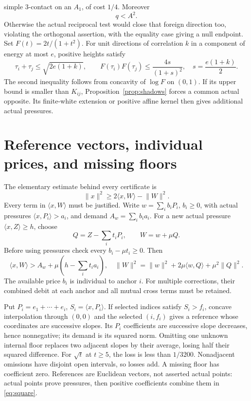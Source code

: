 \documentclass[11pt]{article}
\theoremstyle{definition}
\theoremstyle{remark}
\newcommand{\ip}[2]{\langle #1,#2\rangle}
\newcommand{\norm}[1]{\lVert #1\rVert}
\begin{document}
simple \(3\)-contact on an \(A_1\), of cost \(1/4\).
Moreover
\begin{equation}\label{eq:foreigncost}
 q<A^2.
\end{equation}
Otherwise the actual reciprocal test would close that foreign
direction too, violating the orthogonal assertion, with the
equality case giving a null endpoint.
Set \(F(t)=2t/(1+t^2)\). For unit directions of correlation \(k\)
in a component of energy at most \(e\), positive heights satisfy
\begin{equation}\label{eq:pairupper}
 \tau_i+\tau_j\leq\sqrt{2e(1+k)},\qquad
 F(\tau_i)F(\tau_j)\leq\frac{4s}{(1+s)^2},\quad
 s=\frac{e(1+k)}2.
\end{equation}
The second inequality follows from concavity of \(\log F\) on
\((0,1)\). If its upper bound is smaller than \(K_{ij}\),
Proposition~\ref{prop:shadows} forces a common actual opposite.
Its finite-white extension or positive affine kernel then gives
additional actual pressures.

\section{Reference vectors, individual prices, and missing floors}
\label{sec:references}
The elementary estimate behind every certificate is
\begin{equation}
\label{eq:square}
 \norm{x}^2\geq2\ip{x}{W}-\norm{W}^2.
\end{equation}
Every term in \(\ip{x}{W}\) must be justified.
Write \(w=\sum_i b_iP_i\), \(b_i\geq0\), with actual pressures
\(\ip{x}{P_i}>a_i\), and demand \(A_w=\sum_i b_i a_i\).
For a new actual pressure \(\ip{x}{Z}\geq h\), choose
\[
 Q=Z-\sum_i t_iP_i,\qquad W=w+\mu Q.
\]
Before using pressures check every \(b_i-\mu t_i\geq0\).
Then
\begin{equation}
\label{eq:payment}
 \ip{x}{W}>A_w+\mu(h-\sum_i t_i a_i),\quad
 \norm{W}^2=\norm{w}^2+2\mu\ip{w}{Q}+\mu^2\norm{Q}^2.
\end{equation}
The available price \(b_i\) is individual to anchor \(i\).
For multiple corrections, their combined debit at each anchor
and all mutual cross terms must be retained.

Put \(P_i=e_1+\cdots+e_i\), \(S_i=\ip{x}{P_i}\).
If selected indices satisfy \(S_i>f_i\), concave interpolation
through \((0,0)\) and the selected \((i,f_i)\) gives a reference
whose coordinates are successive slopes. Its \(P_i\) coefficients
are successive slope decreases, hence nonnegative; its demand
is its squared norm. Omitting one unknown internal floor replaces
two adjacent slopes by their average, losing half their squared
difference. For \(\sqrt t\) at \(t\geq5\), the loss is less than
\(1/3200\). Nonadjacent omissions have disjoint open intervals,
so losses add. A missing floor has coefficient zero.
References are Euclidean vectors, not asserted actual points:
actual points prove pressures, then positive coefficients combine
them in \eqref{eq:square}.
\end{document}
